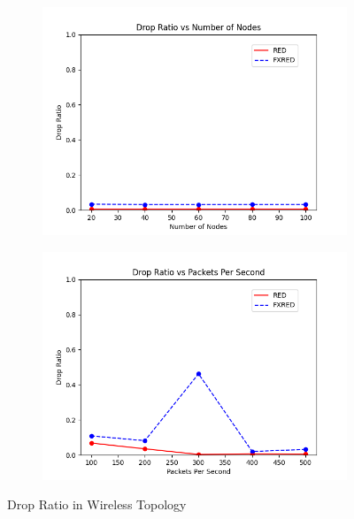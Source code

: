 \documentclass[10pt]{report}
\begin{document}
\begin{figure}
\begin{subfigure}{.5\textwidth}
        \includegraphics[width=1\linewidth]{static/graphs/wireless/Drop Ratio vs Number of Nodes.png}
    \end{subfigure}%
    \begin{subfigure}{.5\textwidth}
        \includegraphics[width=1\linewidth]{static/graphs/wireless/Drop Ratio vs Packets Per Second.png}
    \end{subfigure}
    \caption{Drop Ratio in Wireless Topology}
    \label{fig:wireless_drp_ratio}
\end{figure}
\end{document}
